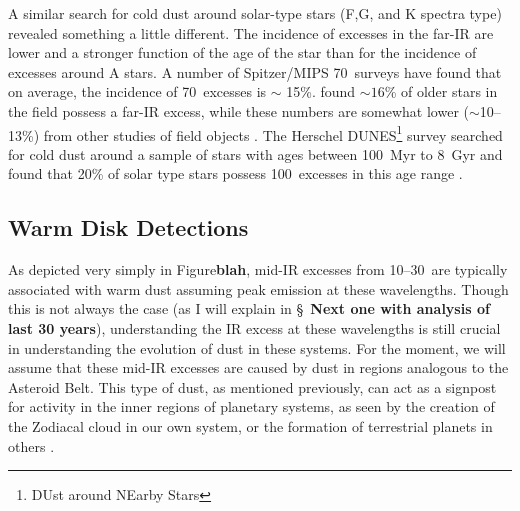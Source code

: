    
   A similar search for cold dust around solar-type stars (F,G, and K spectra type) revealed something a little different. The incidence of excesses in the far-IR are lower and a stronger function of the age of the star than for the incidence of excesses around A stars. A number of Spitzer/MIPS 70\micron\ surveys \citep[e.g.,][]{Trilling2008, Bryden2006, Beichman2006, Hillenbrand2008} have found that on average, the incidence of 70\micron\ excesses is $\sim$ 15\%. \citet{Trilling2008} found $\sim16$\% of older stars in the field possess a far-IR excess, while these numbers are somewhat lower ($\sim$10--13\%) from other studies of field objects \citep{Beichman2006, Bryden2006}. The Herschel DUNES\footnote{DUst around NEarby Stars} survey searched for cold dust around a sample of stars with ages between 100~Myr to 8~Gyr and found that 20\% of solar type stars possess 100\micron\ excesses in this age range \citep{Eiroa2013}. 
   
   
   \subsection{Warm Disk Detections}
   
   As depicted very simply in Figure\textbf{blah}, mid-IR excesses from 10--30\micron\ are typically associated with warm dust assuming peak emission at these wavelengths. Though this is not always the case (as I will explain in \S~\textbf{Next one with analysis of last 30 years}), understanding the IR excess at these wavelengths is still crucial in understanding the evolution of dust in these systems. For the moment, we will assume that these mid-IR excesses are caused by dust in regions analogous to the Asteroid Belt. This type of dust, as mentioned previously, can act as a signpost for activity in the inner regions of planetary systems, as seen by the creation of the Zodiacal cloud in our own system, or the formation of terrestrial planets in others \citep{Song2005}. 
   
